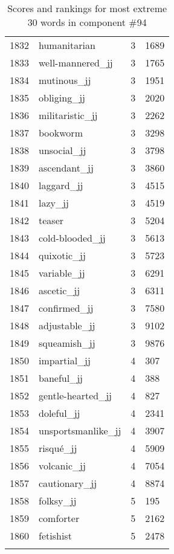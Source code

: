 \begin{longtable}[!htbp]{| rlr@{.}l |}
    1832 & humanitarian & 3 & 1689 \\
    1833 & well-mannered\_jj & 3 & 1765 \\
    1834 & mutinous\_jj & 3 & 1951 \\
    1835 & obliging\_jj & 3 & 2020 \\
    1836 & militaristic\_jj & 3 & 2262 \\
    1837 & bookworm & 3 & 3298 \\
    1838 & unsocial\_jj & 3 & 3798 \\
    1839 & ascendant\_jj & 3 & 3860 \\
    1840 & laggard\_jj & 3 & 4515 \\
    1841 & lazy\_jj & 3 & 4519 \\
    1842 & teaser & 3 & 5204 \\
    1843 & cold-blooded\_jj & 3 & 5613 \\
    1844 & quixotic\_jj & 3 & 5723 \\
    1845 & variable\_jj & 3 & 6291 \\
    1846 & ascetic\_jj & 3 & 6311 \\
    1847 & confirmed\_jj & 3 & 7580 \\
    1848 & adjustable\_jj & 3 & 9102 \\
    1849 & squeamish\_jj & 3 & 9876 \\
    1850 & impartial\_jj & 4 & 307 \\
    1851 & baneful\_jj & 4 & 388 \\
    1852 & gentle-hearted\_jj & 4 & 827 \\
    1853 & doleful\_jj & 4 & 2341 \\
    1854 & unsportsmanlike\_jj & 4 & 3907 \\
    1855 & risqué\_jj & 4 & 5909 \\
    1856 & volcanic\_jj & 4 & 7054 \\
    1857 & cautionary\_jj & 4 & 8874 \\
    1858 & folksy\_jj & 5 & 195 \\
    1859 & comforter & 5 & 2162 \\
    1860 & fetishist & 5 & 2478 \\
    \hline
    \caption{Scores and rankings for most extreme 30 words in component \#94} \\
\end{longtable}
